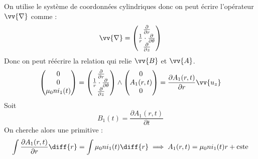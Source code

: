 On utilise le système de coordonnées cylindriques donc on peut écrire l'opérateur $\vv{\nabla}$ comme :
\begin{equation}
  \vv{\nabla} =
  \begin{pmatrix}
    \frac{\partial}{\partial r}\\
    \frac{1}{r} \cdot \frac{\partial}{\partial \theta}\\
    \frac{\partial}{\partial z}
  \end{pmatrix}
\end{equation}
Donc on peut réécrire la relation qui relie $\vv{B}$ et $\vv{A}$.
\begin{equation}
    \begin{pmatrix} 0 \\ 0 \\ \mu_0 n i_1(t) \end{pmatrix} =
    \begin{pmatrix}
      \frac{\partial}{\partial r}\\
      \frac{1}{r} \cdot \frac{\partial}{\partial \theta}\\
      \frac{\partial}{\partial z}
    \end{pmatrix} \wedge \begin{pmatrix}
      0 \\ A_1(r,t) \\ 0
    \end{pmatrix}
    =
    \frac{\partial A_1 (r,t)}{\partial r} \vv{u_z}
\end{equation}
Soit
\begin{equation}
  B_1(t) = \frac{\partial A_1(r,t)}{\partial t}
\end{equation}
On cherche alors une primitive :
\begin{equation}
  \int \frac{\partial A_1 (r,t)}{\partial r}\diff{r} = \int \mu_0 n i_1 (t) \diff{r}
  \implies A_1 (r,t) = \mu_0 n i_1 (t) r + \text{cste}
\end{equation}

